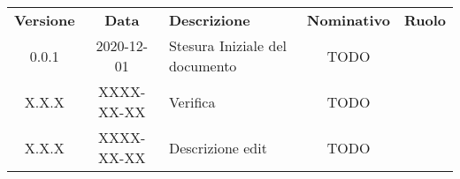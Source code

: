 {
    \renewcommand{\arraystretch}{1.5}
    \centering
    \begin{longtable}{ c c  C{4cm}  c  c }
        \rowcolor{\primaryColor}
        \textcolor{\secondaryColor}{
        \textbf{Versione}}     & \textcolor{\secondaryColor}{\textbf{Data}}       & \textcolor{\secondaryColor}
        {\textbf{Descrizione}} & \textcolor{\secondaryColor}{\textbf{Nominativo}} & \textcolor{\secondaryColor}{\textbf{Ruolo}}                          \\


        0.0.1                  & 2020-12-01                                       & Stesura Iniziale del documento              & TODO &  \\
        X.X.X                  & XXXX-XX-XX                                       & Verifica                                    & TODO & \verificatore{} \\
        X.X.X                  & XXXX-XX-XX                                       & Descrizione edit                            & TODO & \redattore{}    \\
    \end{longtable}
}